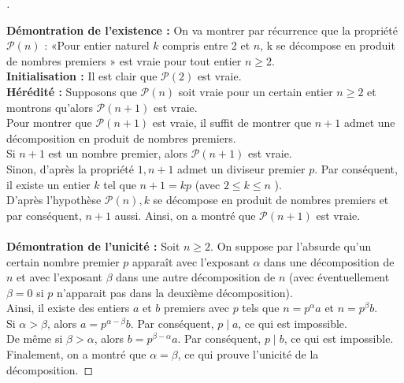 \documentclass[12pt]{article}
\theoremstyle{break}
\newenvironment{demo}[1][\proofname]{%
  \begin{proof}[#1]$ $\newline
}{%
  \end{proof}
}
\begin{document}
\begin{demo}
\textbf{Démontration de l'existence :} On va montrer par récurrence que la propriété $\mathcal{P}(n)$ : «Pour entier naturel $k$ compris entre 2 et $n$, k se décompose en produit de nombres premiers » est vraie pour tout entier $n \geqslant 2$.\\
\textbf{Initialisation :} Il est clair que $\mathcal{P}(2)$ est vraie.\\
\textbf{Hérédité :} Supposons que $\mathcal{P}(n)$ soit vraie pour un certain entier $n \geqslant 2$ et montrons qu'alors $\mathcal{P}(n+1)$ est vraie.\\
Pour montrer que $\mathcal{P}(n+1)$ est vraie, il suffit de montrer que $n+1$ admet une décomposition en produit de nombres premiers.\\
Si $n+1$ est un nombre premier, alors $\mathcal{P}(n+1)$ est vraie.\\
Sinon, d'après la propriété $1, n+1$ admet un diviseur premier $p$. Par conséquent, il existe un entier $k$ tel que $n+1=k p$ (avec $2 \leqslant k \leqslant n$ ).\\
D'après l'hypothèse $\mathcal{P}(n), k$ se décompose en produit de nombres premiers et par conséquent, $n+1$ aussi. Ainsi, on a montré que $\mathcal{P}(n+1)$ est vraie.
~\\~\\
\textbf{Démontration de l'unicité :} Soit $n \geqslant 2$. On suppose par l'absurde qu'un certain nombre premier $p$ apparaît avec l'exposant $\alpha$ dans une décomposition de $n$ et avec l'exposant $\beta$ dans une autre décomposition de $n$ (avec éventuellement $\beta=0$ si $p$ n'apparait pas dans la deuxième décomposition).\\
Ainsi, il existe des entiers $a$ et $b$ premiers avec $p$ tels que $n=p^{\alpha} a$ et $n=p^{\beta} b$.\\
Si $\alpha>\beta$, alors $a=p^{\alpha-\beta} b$. Par conséquent, $p \mid a$, ce qui est impossible.\\
De même si $\beta>\alpha$, alors $b=p^{\beta-\alpha} a$. Par conséquent, $p \mid b$, ce qui est impossible.\\
Finalement, on a montré que $\alpha=\beta$, ce qui prouve l'unicité de la décomposition.
\end{demo}
\end{document}
